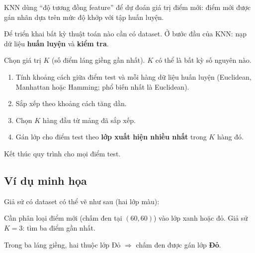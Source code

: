\begin{ynghia}[title={Feature similarity}]
KNN dùng ``độ tương đồng feature'' để dự đoán giá trị điểm mới: điểm mới được gán nhãn dựa trên mức độ khớp với tập huấn luyện.
\end{ynghia}

\begin{phuongphap}[title={Bước 1 --- Dataset}]
Để triển khai bất kỳ thuật toán nào cần có dataset.
Ở bước đầu của KNN: nạp dữ liệu \textbf{huấn luyện} và \textbf{kiểm tra}.
\end{phuongphap}

\begin{phuongphap}[title={Bước 2 --- Chọn $K$}]
Chọn giá trị $K$ (số điểm láng giềng gần nhất). $K$ có thể là bất kỳ số nguyên nào.
\end{phuongphap}

\begin{phuongphap}[title={Bước 3 --- Với mỗi điểm trong tập test}]
\begin{enumerate}
  \item[\textbf{3.1}] Tính khoảng cách giữa điểm test và mỗi hàng dữ liệu huấn luyện (Euclidean, Manhattan hoặc Hamming; phổ biến nhất là Euclidean).
  \item[\textbf{3.2}] Sắp xếp theo khoảng cách tăng dần.
  \item[\textbf{3.3}] Chọn $K$ hàng đầu từ mảng đã sắp xếp.
  \item[\textbf{3.4}] Gán lớp cho điểm test theo \textbf{lớp xuất hiện nhiều nhất} trong $K$ hàng đó.
\end{enumerate}
\end{phuongphap}

\begin{phuongphap}[title={Bước 4 --- Kết thúc}]
Kết thúc quy trình cho mọi điểm test.
\end{phuongphap}

\subsection{Ví dụ minh họa}

\begin{vidu}[title={Phân loại điểm mới với $K = 3$}]
Giả sử có dataset có thể vẽ như sau (hai lớp màu):


Cần phân loại điểm mới (chấm đen tại $(60, 60)$) vào lớp xanh hoặc đỏ.
Giả sử $K = 3$: tìm ba điểm gần nhất.


Trong ba láng giềng, hai thuộc lớp Đỏ $\Rightarrow$ chấm đen được gán lớp \textbf{Đỏ}.
\end{vidu}

